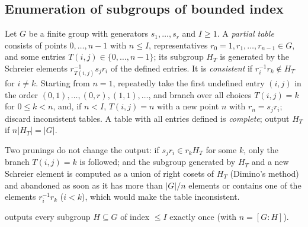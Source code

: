 \subsection*{Enumeration of subgroups of bounded index}

\begin{procedure}\label{alg:coset-tables}
Let $G$ be a finite group with generators $s_1, \ldots, s_r$ and $I \geq 1$.
A \emph{partial table} consists of points $0, \ldots, n-1$ with $n \leq I$,
representatives $r_0 = 1, r_1, \ldots, r_{n-1} \in G$, and some entries
$T(i, j) \in \{0, \ldots, n-1\}$; its subgroup $H_T$ is generated by the
Schreier elements $r_{T(i,j)}^{-1}s_jr_i$ of the defined entries. It is
\emph{consistent} if $r_i^{-1}r_k \notin H_T$ for $i \neq k$. Starting from
$n = 1$, repeatedly take the first undefined entry $(i, j)$ in the order
$(0,1), \ldots, (0,r), (1,1), \ldots$, and branch over all choices
$T(i,j) = k$ for $0 \leq k < n$, and, if $n < I$, $T(i,j) = n$ with a new
point $n$ with $r_n = s_jr_i$; discard inconsistent tables. A table with all
entries defined is \emph{complete}; output $H_T$ if $n|H_T| = |G|$.

Two prunings do not change the output: if $s_jr_i \in r_kH_T$ for some $k$,
only the branch $T(i,j) = k$ is followed; and the subgroup generated by $H_T$
and a new Schreier element is computed as a union of right cosets of $H_T$
(Dimino's method) and abandoned as soon as it has more than $|G|/n$ elements
or contains one of the elements $r_i^{-1}r_k$ ($i < k$), which would make the table
inconsistent.
\end{procedure}

\begin{proposition}\label{prop:coset-tables}
 outputs every subgroup $H \subseteq G$ of index $\leq I$
exactly once (with $n = [G:H]$).
\end{proposition}

